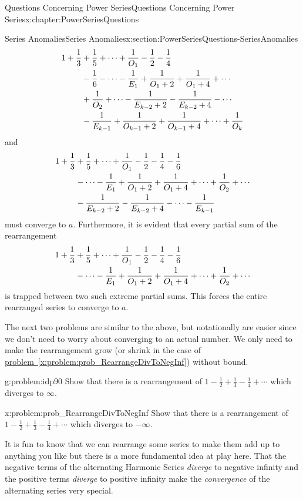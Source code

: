 \begin{chapterptx}{Questions Concerning Power Series}{}{Questions Concerning Power Series}{}{}{x:chapter:PowerSeriesQuestions}
\begin{sectionptx}{Series Anomalies}{}{Series Anomalies}{}{}{x:section:PowerSeriesQuestions-SeriesAnomalies}
		\begin{align*}
			1+\frac{1}{3}& +\frac{1}{5}+\cdots+\frac{1}{O_1}-\frac{1}{2}-\frac{1}{4}\\
			& -\frac{1}{6}-\cdots-\frac{1}{E_1}+\frac{1}{O_1+2}+\frac{1}{O_1+4}+\cdots\\
			& + \frac{1}{O_2}+\cdots -\frac{1}{E_{k-2}+2}-\frac{1}{E_{k-2}+4}-\cdots\\
			& -\frac{1}{E_{k-1}}+  \frac{1}{O_{k-1}+2}+\frac{1}{O_{k-1}+4}+\cdots+\frac{1}{O_k}
		\end{align*}
		and%
		\begin{align*}
			1+\frac{1}{3}& +\frac{1}{5}+\cdots+\frac{1}{O_1}-\frac{1}{2}-\frac{1}{4}- \frac{1}{6}\\
			& -\cdots-\frac{1}{E_1}+\frac{1}{O_1+2}+\frac{1}{O_1+4}+\cdots+ \frac{1}{O_2}+\cdots\\
			& -\frac{1}{E_{k-2}+2}-\frac{1}{E_{k-2}+4}-\cdots-\frac{1}{E_{k-1}}
		\end{align*}
		must converge to \(a\). Furthermore, it is evident that every partial sum of the rearrangement%
		\begin{align*}
			1+\frac{1}{3}& +\frac{1}{5}+\cdots+\frac{1}{O_1}-\frac{1}{2}-\frac{1}{4}- \frac{1}{6}\\
			& -\cdots-\frac{1}{E_1}+\frac{1}{O_1+2}+\frac{1}{O_1+4}+\cdots+ \frac{1}{O_2}+\cdots
		\end{align*}
		is trapped between two such extreme partial sums. This forces the entire rearranged series to converge to \(a\).%
		\par
		The next two problems are similar to the above, but notationally are easier since we don't need to worry about converging to an actual number. We only need to make the rearrangement grow (or shrink in the case of \hyperref[x:problem:prob_RearrangeDivToNegInf]{problem~{\xreffont\ref{x:problem:prob_RearrangeDivToNegInf}}}) without bound.%
		\begin{problem}{}{g:problem:idp90}%
			Show that there is a rearrangement of \(1-\frac{1}{2}+\frac{1}{3}-\frac{1}{4}+\cdots\) which diverges to \(\infty\).%
		\end{problem}
		\begin{problem}{}{x:problem:prob_RearrangeDivToNegInf}%
			Show that there is a rearrangement of \(1-\frac{1}{2}+\frac{1}{3}-\frac{1}{4}+\cdots\) which diverges to \(-\infty\).%
		\end{problem}
		It is fun to know that we can rearrange some series to make them add up to anything you like but there is a more fundamental idea at play here. That the negative terms of the alternating Harmonic Series \emph{diverge} to negative infinity and the positive terms \emph{diverge} to positive infinity make the \emph{convergence} of the alternating series very special.%

\end{sectionptx}
\end{chapterptx}
